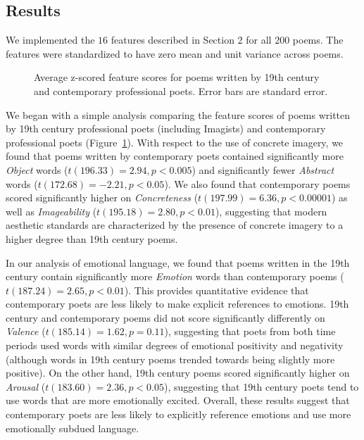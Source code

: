 \documentclass{book}
\begin{document}
\subsection{Results}

We implemented the $16$ features described in Section 2 for all $200$ poems. The features were standardized to have zero mean and unit variance across poems. 

\begin{figure}
\caption{Average z-scored feature scores for poems written by 19th century and contemporary professional poets. Error bars are standard error.} 
\label{fig1}
\end{figure}

We began with a simple analysis comparing the feature scores of poems written by 19th century professional poets (including Imagists) and contemporary professional poets (Figure~\ref{fig1}). With respect to the use of concrete imagery, we found that poems written by contemporary poets contained significantly more \emph{Object} words ($t(196.33) = 2.94, p < 0.005$) and significantly fewer \emph{Abstract} words ($t(172.68) = -2.21, p < 0.05$).
We also found that contemporary poems scored significantly higher on \emph{Concreteness} ($t(197.99) = 6.36, p < 0.00001$) as well as \emph{Imageability} ($t(195.18) = 2.80, p < 0.01$), suggesting that modern aesthetic standards are characterized by the presence of concrete imagery to a higher degree than 19th century poems.

In our analysis of emotional language, we found that poems written in the 19th century contain significantly more \emph{Emotion} words than contemporary poems ($t(187.24) = 2.65, p < 0.01$). This provides quantitative evidence that contemporary poets are less likely to make explicit references to emotions. 19th century and contemporary poems did not score significantly differently on \emph{Valence} ($t(185.14) = 1.62, p = 0.11$), suggesting that poets from both time periods used words with similar degrees of emotional positivity and negativity (although words in 19th century poems trended towards being slightly more positive). On the other hand, 19th century poems scored significantly higher on \emph{Arousal} ($t(183.60) = 2.36, p < 0.05$), suggesting that 19th century poets tend to use words that are more emotionally excited. Overall, these results suggest that contemporary poets are less likely to explicitly reference emotions and use more emotionally subdued language. 
\end{document}
